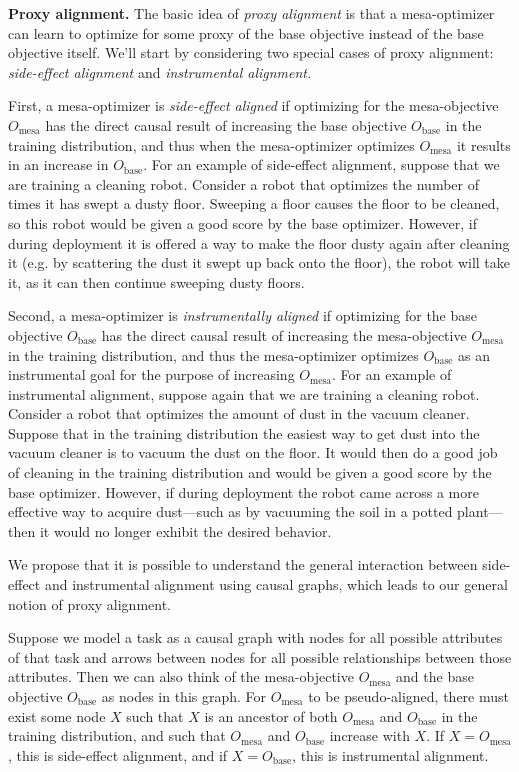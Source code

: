 \documentclass[
  onecolumn,
  natbib,
]{miri-tech-article}
\begin{document}
\textbf{Proxy alignment.} The basic idea of \textit{proxy alignment} is that a mesa-optimizer can learn to optimize for some proxy of the base objective instead of the base objective itself. We'll start by considering two special cases of proxy alignment: \textit{side-effect alignment} and \textit{instrumental alignment.}

First, a mesa-optimizer is \textit{side-effect aligned} if optimizing for the mesa-objective $O_\text{mesa}$ has the direct causal result of increasing the base objective $O_\text{base}$ in the training distribution, and thus when the mesa-optimizer optimizes $O_\text{mesa}$ it results in an increase in $O_\text{base}$. For an example of side-effect alignment, suppose that we are training a cleaning robot. Consider a robot that optimizes the number of times it has swept a dusty floor. Sweeping a floor causes the floor to be cleaned, so this robot would be given a good score by the base optimizer. However, if during deployment it is offered a way to make the floor dusty again after cleaning it (e.g. by scattering the dust it swept up back onto the floor), the robot will take it, as it can then continue sweeping dusty floors.

Second, a mesa-optimizer is \textit{instrumentally aligned} if optimizing for the base objective $O_\text{base}$ has the direct causal result of increasing the mesa-objective $O_\text{mesa}$ in the training distribution, and thus the mesa-optimizer optimizes $O_\text{base}$ as an instrumental goal for the purpose of increasing $O_\text{mesa}$. For an example of instrumental alignment, suppose again that we are training a cleaning robot. Consider a robot that optimizes the amount of dust in the vacuum cleaner. Suppose that in the training distribution the easiest way to get dust into the vacuum cleaner is to vacuum the dust on the floor. It would then do a good job of cleaning in the training distribution and would be given a good score by the base optimizer. However, if during deployment the robot came across a more effective way to acquire dust---such as by vacuuming the soil in a potted plant---then it would no longer exhibit the desired behavior.

We propose that it is possible to understand the general interaction between side-effect and instrumental alignment using causal graphs, which leads to our general notion of proxy alignment.

Suppose we model a task as a causal graph with nodes for all possible attributes of that task and arrows between nodes for all possible relationships between those attributes. Then we can also think of the mesa-objective $O_\text{mesa}$ and the base objective $O_\text{base}$ as nodes in this graph. For $O_\text{mesa}$ to be pseudo-aligned, there must exist some node $X$ such that $X$ is an ancestor of both $O_\text{mesa}$ and $O_\text{base}$ in the training distribution, and such that $O_\text{mesa}$ and $O_\text{base}$ increase with $X$. If $X = O_\text{mesa}$, this is side-effect alignment, and if $X = O_\text{base}$, this is instrumental alignment.
\end{document}
